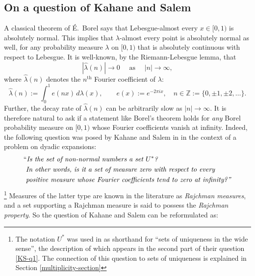 \documentclass[12pt, twoside]{article}
\theoremstyle{definition}
\numberwithin{equation}{section}
\begin{document}
\subsection{On a question of Kahane and Salem} A classical theorem of \'E.~Borel \cite{b09} says that Lebesgue-almost every $x \in [0,1)$ is absolutely normal. This implies that $\lambda$-almost every point is absolutely normal as well, for any probability measure $\lambda$ on $[0, 1)$ that is absolutely continuous with respect to Lebesgue. It is well-known, by the Riemann-Lebesgue lemma, that 
\[ |\widehat{\lambda}(n)| \rightarrow 0 \quad \text{ as } \quad |n| \rightarrow \infty, \] 
where $\widehat{\lambda}(n)$ denotes the $n^{\text{th}}$ Fourier coefficient of $\lambda$:  
\begin{equation} \widehat{\lambda}(n) := \int_{0}^{1} e(nx) \, d\lambda(x), \qquad e(x) := e^{-2 \pi i x}, \quad n \in \mathbb Z := \{0, \pm 1, \pm 2, \ldots \}. \label{Fourier-coefficient-def} \end{equation}  
Further, the decay rate of $\widehat{\lambda}(n)$ can be arbitrarily slow as $|n| \rightarrow \infty$. It is therefore natural to ask if a statement like Borel's theorem holds for {\em{any}} Borel probability measure on $[0, 1)$ whose Fourier coefficients vanish at infinity. Indeed, the following question was posed by Kahane and Salem in \cite[p 261]{Kahane-Salem-64} in the context of a problem on dyadic expansions: 
\begin{equation} \label{KS-q1}  
\begin{aligned} 
&\text{``{\em{Is the set of non-normal numbers a set $U^{\ast}$? }}} \\  
&\text{\em{ In other words, is it a set of measure zero with respect to every }} \\
&\text{\em{ positive measure whose Fourier coefficients tend to zero at infinity?''}}
\end{aligned}
\end{equation}  
\footnote{The notation $U^{\ast}$ was used in \cite{Kahane-Salem-64} as shorthand for ``sets of uniqueness in the wide sense'', the description of which appears in the second part of their question \eqref{KS-q1}. The connection of this question to sets of uniqueness is explained in Section \ref{multiplicity-section}} 
Measures of the latter type are known in the literature as {\em{Rajchman measures}}, and a set supporting a Rajchman measure is said to possess the {\em{Rajchman property}}. So the question of Kahane and Salem can be reformulated as: 
\end{document}
